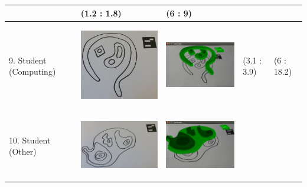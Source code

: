 \documentclass[11pt]{article}
\begin{document}
\begin{landscape}
\begin{longtable}{p{}| p{}| p{} | p{} |p{}}
							& (1.2 : 1.8)
							& (6 : 9)\\
\hline
9. Student (Computing) & \begin{center}\includegraphics[scale=0.5]{pics/usertesting/9.png}\end{center} 
							& \begin{center}\includegraphics[scale=0.5]{pics/usertesting/9render.png}\end{center} 
							& (3.1 : 3.9)
							& (6 : 18.2)\\
\hline
10. Student (Other) & \begin{center}\includegraphics[scale=0.5]{pics/usertesting/10.png}\end{center} 
							& \begin{center}\includegraphics[scale=0.5]{pics/usertesting/10render.png}\end{center} 

\end{longtable}
\end{landscape}
\end{document}
